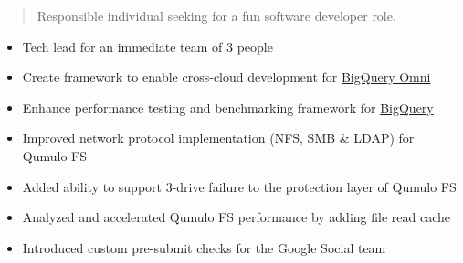\documentclass[10pt,a4paper,normalphoto]{altacv}
\begin{document}
\begin{paracol}{2}
        \newpage
        
        \switchcolumn
        
            \begin{quote}
                Responsible individual seeking for a fun software developer role.
            \end{quote}
        
            \begin{itemize}
            	\item Tech lead for an immediate team of 3 people
                \item Create framework to enable cross-cloud development for \href{https://cloud.google.com/blog/products/data-analytics/introducing-bigquery-omni}{BigQuery Omni}
                \item Enhance performance testing and benchmarking framework for \href{https://cloud.google.com/bigquery}{BigQuery}
            \end{itemize}
            \divider
            
            \begin{itemize}
                \item Improved network protocol implementation (NFS, SMB \& LDAP) for Qumulo FS
                \item Added ability to support 3-drive failure to the protection layer of Qumulo FS
                \item Analyzed and accelerated Qumulo FS performance by adding file read cache
            \end{itemize}
            \divider
            
            \begin{itemize}
                \item Introduced custom pre-submit checks for the Google Social team
            \end{itemize}
            \divider
            

\end{paracol}
\end{document}
